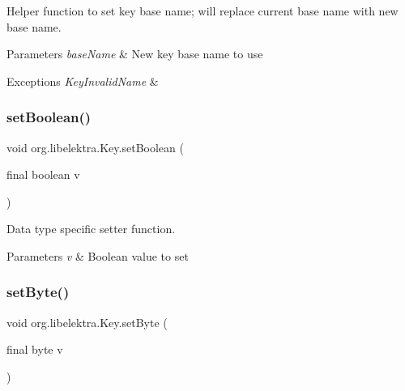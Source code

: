 Helper function to set key base name; will replace current base name with new base name. 


\begin{DoxyParams}{Parameters}
{\em base\+Name} & New key base name to use \\
\hline
\end{DoxyParams}

\begin{DoxyExceptions}{Exceptions}
{\em Key\+Invalid\+Name} & \\
\hline
\end{DoxyExceptions}
\mbox{\label{classorg_1_1libelektra_1_1Key_a005125c24abc41a799d73d09c8c148f1}} 
\subsubsection{\texorpdfstring{set\+Boolean()}{setBoolean()}}
{\footnotesize\ttfamily void org.\+libelektra.\+Key.\+set\+Boolean (\begin{DoxyParamCaption}\item[{final boolean}]{v }\end{DoxyParamCaption})\hspace{0.3cm}{\ttfamily [inline]}}



Data type specific setter function. 


\begin{DoxyParams}{Parameters}
{\em v} & Boolean value to set \\
\hline
\end{DoxyParams}
\mbox{\label{classorg_1_1libelektra_1_1Key_ab9576c2e1e526ee23904a50b02386b45}} 
\subsubsection{\texorpdfstring{set\+Byte()}{setByte()}}
{\footnotesize\ttfamily void org.\+libelektra.\+Key.\+set\+Byte (\begin{DoxyParamCaption}\item[{final byte}]{v }\end{DoxyParamCaption})\hspace{0.3cm}{\ttfamily [inline]}}



